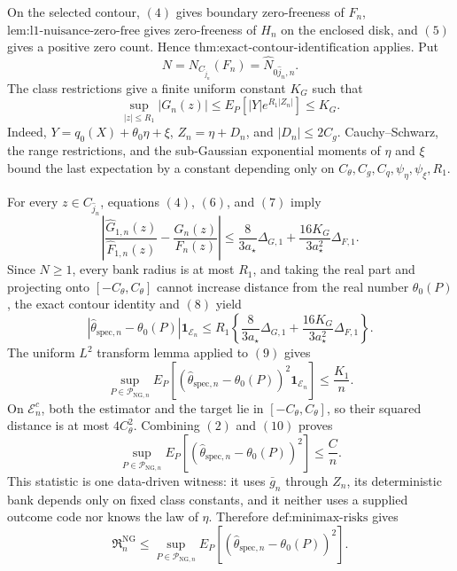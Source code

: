 On the selected contour, \((4)\) gives boundary zero-freeness of \(F_n\), \(\text{lem:l1-nuisance-zero-free}\) gives zero-freeness of \(H_n\) on the enclosed disk, and \((5)\) gives a positive zero count.  Hence \(\text{thm:exact-contour-identification}\) applies.  Put
\[
 N=N_{C_{\widehat j_n}}(F_n)
  =\widehat N_{0\widehat j_n,n}.
\]
The class restrictions give a finite uniform constant \(K_G\) such that
\[
 \sup_{|z|\le R_1}|G_n(z)|
 \le E_P[|Y|e^{R_1|Z_n|}]
 \le K_G. \tag{7}
\]
Indeed, \(Y=q_0(X)+\theta_0\eta+\xi\), \(Z_n=\eta+D_n\), and \(|D_n|\le2C_g\).  Cauchy--Schwarz, the range restrictions, and the sub-Gaussian exponential moments of \(\eta\) and \(\xi\) bound the last expectation by a constant depending only on \(C_\theta,C_g,C_q,\psi_\eta,\psi_\xi,R_1\).

For every \(z\in C_{\widehat j_n}\), equations \((4)\), \((6)\), and \((7)\) imply
\[
 \left|
  \frac{\widehat G_{1,n}(z)}{\widehat F_{1,n}(z)}
  -\frac{G_n(z)}{F_n(z)}
 \right|
 \le
 \frac{8}{3a_\star}\Delta_{G,1}
 +\frac{16K_G}{3a_\star^2}\Delta_{F,1}. \tag{8}
\]
Since \(N\ge1\), every bank radius is at most \(R_1\), and taking the real part and projecting onto \([-C_\theta,C_\theta]\) cannot increase distance from the real number \(\theta_0(P)\), the exact contour identity and \((8)\) yield
\[
 |\widehat\theta_{\mathrm{spec},n}-\theta_0(P)|\mathbf 1_{\mathcal E_n}
 \le R_1\left\{
   \frac{8}{3a_\star}\Delta_{G,1}
   +\frac{16K_G}{3a_\star^2}\Delta_{F,1}
 \right\}. \tag{9}
\]
The uniform \(L^2\) transform lemma applied to \((9)\) gives
\[
 \sup_{P\in\mathcal P_{\mathrm{NG},n}}
 E_P\!\left[(\widehat\theta_{\mathrm{spec},n}-\theta_0(P))^2
              \mathbf 1_{\mathcal E_n}\right]
 \le\frac{K_1}{n}. \tag{10}
\]
On \(\mathcal E_n^c\), both the estimator and the target lie in \([-C_\theta,C_\theta]\), so their squared distance is at most \(4C_\theta^2\).  Combining \((2)\) and \((10)\) proves
\[
 \sup_{P\in\mathcal P_{\mathrm{NG},n}}
 E_P[(\widehat\theta_{\mathrm{spec},n}-\theta_0(P))^2]
 \le\frac Cn. \tag{11}
\]
This statistic is one data-driven witness: it uses \(\bar g_n\) through \(Z_n\), its deterministic bank depends only on fixed class constants, and it neither uses a supplied outcome code nor knows the law of \(\eta\).  Therefore \(\text{def:minimax-risks}\) gives
\[
 \mathfrak R_n^{\mathrm{NG}}
 \le\sup_{P\in\mathcal P_{\mathrm{NG},n}}
 E_P[(\widehat\theta_{\mathrm{spec},n}-\theta_0(P))^2]. \tag{12}
\]

